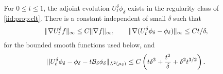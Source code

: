 \documentclass[11pt,reqno]{amsart}
\numberwithin{equation}{section}
\theoremstyle{plain}
\theoremstyle{remark}
\DeclarePairedDelimiter{\norm}{\lVert}{\rVert}
\begin{document}
\begin{lemma}\label{iid:lem:adjoint-estimate}
For $0\le t\le1$, the adjoint evolution $U_t^\delta\phi_\delta$ exists in the regularity class of \cref{iid:prop:clt}. There is a constant independent of small $\delta$ such that
\begin{equation}\label{iid:eq:gradient-evolution}
 \norm{\nabla U_t^\delta f}_\infty\le C\norm{\nabla f}_\infty,
 \qquad
 \norm{\nabla(U_t^\delta\phi_\delta-\phi_\delta)}_\infty
 \le Ct/\delta,
\end{equation}
for the bounded smooth functions used below, and
\begin{equation}\label{iid:eq:adjoint-expansion}
 \norm{U_t^\delta\phi_\delta-\phi_\delta-t\mathcal B_\delta\phi_\delta}_{L^2(\mu_\delta)}
 \le C\left(t\delta^3+\frac{t^2}{\delta}
 +\delta^2t^{3/2}\right).
\end{equation}
\end{lemma}
\end{document}
